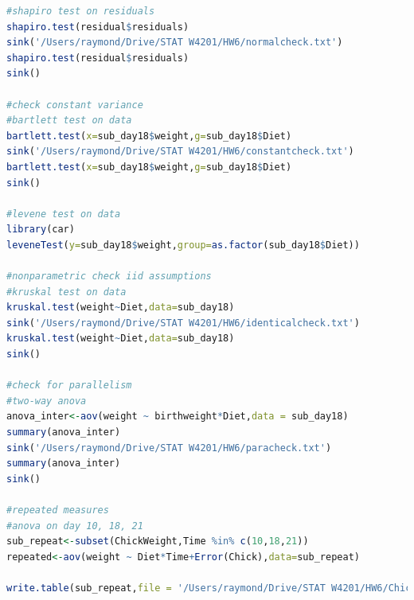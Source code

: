 \documentclass[10pt,letterpaper]{article}
\begin{document}
\begin{lstlisting}[language=R]
#shapiro test on residuals
shapiro.test(residual$residuals)
sink('/Users/raymond/Drive/STAT W4201/HW6/normalcheck.txt')
shapiro.test(residual$residuals)
sink()

#check constant variance
#bartlett test on data
bartlett.test(x=sub_day18$weight,g=sub_day18$Diet)
sink('/Users/raymond/Drive/STAT W4201/HW6/constantcheck.txt')
bartlett.test(x=sub_day18$weight,g=sub_day18$Diet)
sink()

#levene test on data
library(car)
leveneTest(y=sub_day18$weight,group=as.factor(sub_day18$Diet))

#nonparametric check iid assumptions
#kruskal test on data
kruskal.test(weight~Diet,data=sub_day18)
sink('/Users/raymond/Drive/STAT W4201/HW6/identicalcheck.txt')
kruskal.test(weight~Diet,data=sub_day18)
sink()

#check for parallelism
#two-way anova
anova_inter<-aov(weight ~ birthweight*Diet,data = sub_day18)
summary(anova_inter)
sink('/Users/raymond/Drive/STAT W4201/HW6/paracheck.txt')
summary(anova_inter)
sink()

#repeated measures
#anova on day 10, 18, 21
sub_repeat<-subset(ChickWeight,Time %in% c(10,18,21))
repeated<-aov(weight ~ Diet*Time+Error(Chick),data=sub_repeat)

write.table(sub_repeat,file = '/Users/raymond/Drive/STAT W4201/HW6/ChickWeight.csv',col.names=TRUE,row.names=FALSE,sep=",")
\end{lstlisting}
\end{document}

